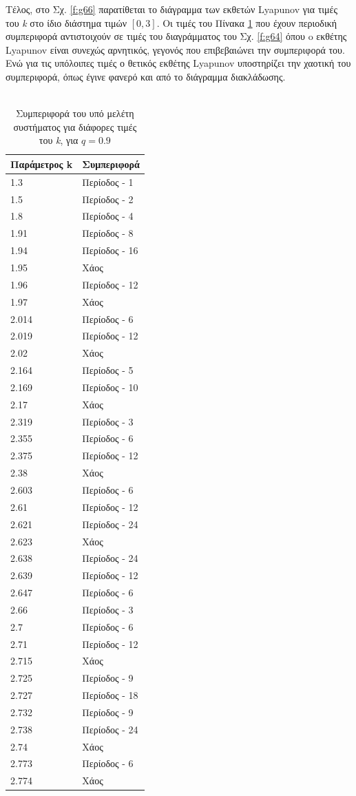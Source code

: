 Τέλος, στο Σχ. \ref{f:g66} παρατίθεται το διάγραμμα των εκθετών Lyapunov για τιμές του \emph{k} στο ίδιο διάστημα τιμών $[0, 3]$. Οι τιμές του Πίνακα \ref{tab:abc13} που έχουν περιοδική συμπεριφορά αντιστοιχούν σε τιμές του διαγράμματος του Σχ. \ref{f:g64} όπου o εκθέτης Lyapunov είναι συνεχώς αρνητικός, γεγονός που επιβεβαιώνει την συμπεριφορά του. Ενώ για τις υπόλοιπες τιμές ο θετικός εκθέτης Lyapunov υποστηρίζει την χαοτική του συμπεριφορά, όπως έγινε φανερό και από το διάγραμμα διακλάδωσης.\\\\

\begin{table}[ht]
	\centering
	\caption{ Συμπεριφορά του υπό μελέτη συστήματος για διάφορες τιμές του \emph{k}, για $q=0.9$ }
	\label{tab:abc13}
	\begin{tabular}{l | l}
		Παράμετρος k & Συμπεριφορά \\
		\hline
		1.3 &  Περίοδος -  1 \\
		1.5 &  Περίοδος -  2 \\
		1.8& Περίοδος -  4 \\
		1.91& Περίοδος -  8 \\
		1.94& Περίοδος -  16 \\
		1.95 & Xάος \\
		1.96& Περίοδος - 12 \\
		1.97& Xάος \\
		2.014& Περίοδος - 6 \\
		2.019& Περίοδος - 12\\
		2.02& Χάος \\
		2.164& Περίοδος - 5 \\
		2.169 &  Περίοδος - 10  \\
		2.17 &  Χάος \\
		2.319& Περίοδος - 3 \\
		2.355 &  Περίοδος - 6  \\
		2.375 &  Περίοδος -  12 \\
		2.38 &Χάος \\
		2.603 & Περίοδος - 6\\
		2.61& Περίοδος - 12\\
		2.621& Περίοδος - 24\\
		2.623& Xάος\\
		2.638 & Περίοδος - 24\\
		2.639& Περίοδος - 12\\
		2.647& Περίοδος - 6\\
		2.66 & Περίοδος - 3\\
		2.7 & Περίοδος -  6\\
		2.71 & Περίοδος -  12\\
		2.715 & Xάος\\
		2.725 & Περίοδος - 9\\
		2.727 & Περίοδος -  18\\
		2.732 & Περίοδος -  9\\
		2.738 & Περίοδος -  24\\
		2.74& Χάος\\
		2.773 & Περίοδος -  6\\
		2.774& Χάος\\
		

\end{tabular}
\end{table}
